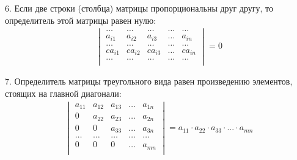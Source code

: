 \documentclass[a4paper,12pt,oneside]{extbook}
\theoremstyle{numbered}
\theoremstyle{unnumbered}
\theoremstyle{named}
\theoremstyle{unnumbered}
\theoremstyle{named}
\theoremstyle{named}
\theoremstyle{named}
\begin{document}
6. Если две строки (столбца) матрицы пропорциональны друг другу, то определитель этой матрицы равен нулю:
\begin{gather*}
    \begin{vmatrix}
        \dots   & \dots   & \dots   & \dots & \dots   \\
        a_{i1}  & a_{i2}  & a_{i3}  & \dots & a_{in}  \\
        \dots   & \dots   & \dots   & \dots & \dots   \\
        ca_{i1} & ca_{i2} & ca_{i3} & \dots & ca_{in} \\
        \dots   & \dots   & \dots   & \dots & \dots   \\
    \end{vmatrix}
    = 0
\end{gather*}

7. Определитель матрицы треугольного вида равен произведению элементов, стоящих на главной диагонали:
\begin{gather*}
    \begin{vmatrix}
        a_{11} & a_{12} & a_{13} & \dots & a_{1n} \\
        0      & a_{22} & a_{23} & \dots & a_{2n} \\
        0      & 0      & a_{33} & \dots & a_{3n} \\
        \dots  & \dots  & \dots  & \dots & \dots  \\
        0      & 0      & 0      & \dots & a_{mn} \\
    \end{vmatrix}
    = a_{11} \cdot a_{22} \cdot a_{33} \cdot ... \cdot a_{mn}
\end{gather*}
\end{document}
